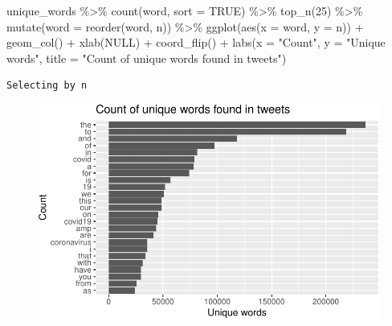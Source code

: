 \documentclass[
  letterpaper,
  DIV=11,
  numbers=noendperiod]{scrreprt}
\newenvironment{Shaded}{\begin{snugshade}}{\end{snugshade}}
\newcommand{\AttributeTok}[1]{\textcolor[rgb]{0.40,0.45,0.13}{#1}}
\newcommand{\ConstantTok}[1]{\textcolor[rgb]{0.56,0.35,0.01}{#1}}
\newcommand{\DecValTok}[1]{\textcolor[rgb]{0.68,0.00,0.00}{#1}}
\newcommand{\FunctionTok}[1]{\textcolor[rgb]{0.28,0.35,0.67}{#1}}
\newcommand{\NormalTok}[1]{\textcolor[rgb]{0.00,0.23,0.31}{#1}}
\newcommand{\SpecialCharTok}[1]{\textcolor[rgb]{0.37,0.37,0.37}{#1}}
\newcommand{\StringTok}[1]{\textcolor[rgb]{0.13,0.47,0.30}{#1}}
\begin{document}
\begin{Shaded}
\begin{Highlighting}[]
\NormalTok{unique\_words }\SpecialCharTok{\%\textgreater{}\%}
  \FunctionTok{count}\NormalTok{(word, }\AttributeTok{sort =} \ConstantTok{TRUE}\NormalTok{) }\SpecialCharTok{\%\textgreater{}\%}
  \FunctionTok{top\_n}\NormalTok{(}\DecValTok{25}\NormalTok{) }\SpecialCharTok{\%\textgreater{}\%}
  \FunctionTok{mutate}\NormalTok{(}\AttributeTok{word =} \FunctionTok{reorder}\NormalTok{(word, n)) }\SpecialCharTok{\%\textgreater{}\%}
  \FunctionTok{ggplot}\NormalTok{(}\FunctionTok{aes}\NormalTok{(}\AttributeTok{x =}\NormalTok{ word, }\AttributeTok{y =}\NormalTok{ n)) }\SpecialCharTok{+}
  \FunctionTok{geom\_col}\NormalTok{() }\SpecialCharTok{+}
  \FunctionTok{xlab}\NormalTok{(}\ConstantTok{NULL}\NormalTok{) }\SpecialCharTok{+}
  \FunctionTok{coord\_flip}\NormalTok{() }\SpecialCharTok{+}
      \FunctionTok{labs}\NormalTok{(}\AttributeTok{x =} \StringTok{"Count"}\NormalTok{,}
      \AttributeTok{y =} \StringTok{"Unique words"}\NormalTok{,}
      \AttributeTok{title =} \StringTok{"Count of unique words found in tweets"}\NormalTok{)}
\end{Highlighting}
\end{Shaded}

\begin{verbatim}
Selecting by n
\end{verbatim}

\begin{figure}[H]

{\centering \includegraphics{./textanalysis_files/figure-pdf/unnamed-chunk-7-1.pdf}

}

\end{figure}
\end{document}

